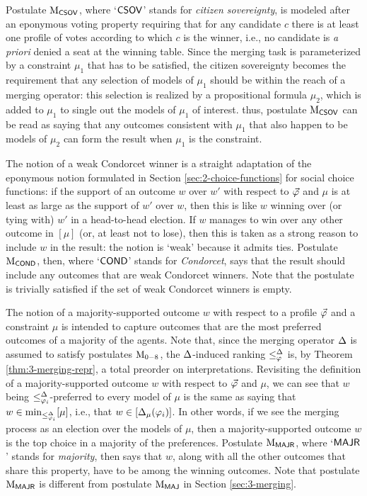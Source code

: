 Postulate $\ppm{\CSOV}$, where `$\CSOV$' stands for \emph{citizen sovereignty},
is modeled after an eponymous voting property
requiring that for any candidate $c$ there is at least one profile of votes 
according to which $c$ is the winner,
i.e., no candidate is \emph{a priori} denied a seat at the winning table.
Since the merging task is parameterized by a constraint $\mu_1$ that has to be satisfied, 
the citizen sovereignty becomes the requirement that any selection of 
models of $\mu_1$ should be within the reach of a merging operator:
this selection is realized by a propositional formula $\mu_2$, 
which is added to $\mu_1$ to single out the models of $\mu_1$ of interest.
thus, postulate $\ppm{\CSOV}$ can be read as saying that any outcomes consistent with $\mu_1$
that also happen to be models of $\mu_2$ can form the result when $\mu_1$ is the constraint.

The notion of a weak Condorcet winner is a straight adaptation of the eponymous notion
formulated in Section \ref{sec:2-choice-functions}
for social choice functions: 
if the support of an outcome $w$ over $w'$
with respect to $\P$ and $\mu$ is at least as large as the support 
of $w'$ over $w$, then this is like $w$ winning over (or tying with) $w'$ in a head-to-head
election. If $w$ manages to win over any other outcome in $[\mu]$
(or, at least not to lose), then this is taken as a strong reason to include $w$ in the result:
the notion is `weak' because it admits ties. 
Postulate $\ppm{\COND}$, then, 
where `$\COND$' stands for \emph{Condorcet},
says that the result should include any 
outcomes that are weak Condorcet winners.
Note that the postulate is trivially satisfied 
if the set of weak Condorcet winners is empty.

The notion of a majority-supported outcome $w$ with respect to a profile $\P$ 
and a constraint $\mu$ is intended to capture outcomes that are the most
preferred outcomes of a majority of the agents.
Note that, since the merging operator $\me$ is assumed to satisfy postulates 
$\ppm{0-8}$, the $\me$-induced ranking $\le^\me_\phi$ is,
by Theorem \ref{thm:3-merging-repr}, a total preorder on interpretations.
Revisiting the definition of a majority-supported outcome $w$ with respect to $\P$ and $\mu$,
we can see that $w$ being $\le^\me_{\phi_i}$-preferred to every model of $\mu$
is the same as saying that $w\in\min_{\le^\me_{\phi_i}}[\mu]$,
i.e., that $w\in[\me_\mu(\phi_i)]$.
In other words, if we see the merging process as an election over the models of $\mu$,
then a majority-supported outcome $w$ is the top choice in a majority of the preferences.
Postulate $\ppm{\MAJR}$, where `$\MAJR$' stands for \emph{majority},
then says that $w$, along with all the other outcomes that 
share this property, have to be among the winning outcomes.
Note that postulate $\ppm{\MAJR}$ is different from postulate $\ppm{\MAJ}$ in Section \ref{sec:3-merging}.

